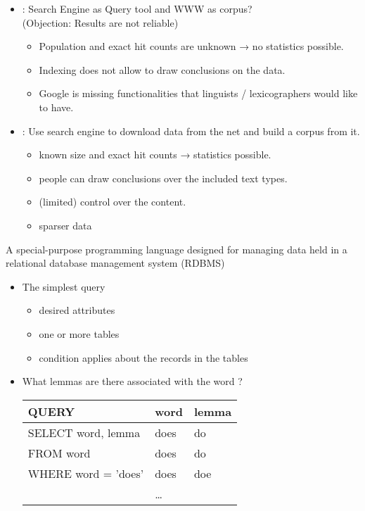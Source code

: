 \documentclass[a4paper,landscape,headrule,footrule,dvips]{foils}
\begin{document}
\begin{CJK}{UTF8}{min}
\begin{itemize}
\item {}: Search Engine as Query tool and WWW as corpus?
\\  (Objection: Results are not reliable)
\begin{itemize}
\item Population and exact hit counts are unknown → no statistics
possible.
\item Indexing does not allow to draw conclusions on the data.
\item[\Bad] Google is missing functionalities that linguists /
lexicographers would like to have.
\end{itemize}
\item {}: Use search engine to download data from the
net and build a corpus from it.
\begin{itemize}
\item known size and exact hit counts → statistics possible.
\item people can draw conclusions over the included text types.
\item (limited) control over the content.
\item[\Bad] sparser data
\end{itemize}
\end{itemize}



A special-purpose programming language designed for managing data held
in a relational database management system (RDBMS)

\begin{itemize} \addtolength{\itemsep}{-1ex}
\item The simplest query
  \begin{itemize}
  \item {} desired attributes
  \item {} one or more tables
  \item {} condition applies about the records in the tables
  \end{itemize}
\item What lemmas are there associated with the word ?

  \begin{tabular}{l|ll}
\textbf{QUERY}  &   \textbf{word} & \textbf{lemma} \\ \hline
SELECT word, lemma  &   does & do \\
FROM word           &   does & do \\
WHERE word = 'does' &   does & doe \\
    & \ldots
  \end{tabular}
\end{itemize}


\end{CJK}
\end{document}
